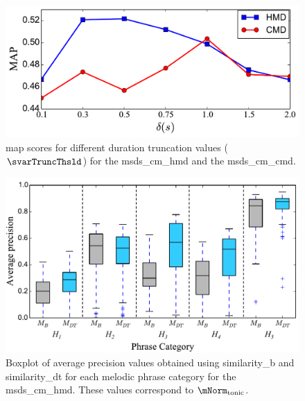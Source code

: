 \begin{figure}
	\begin{center}
		\includegraphics[width=\figSizeEightyFive]{ch06_patterns/figures/ImprovingSimilarity/MAP_per_Duration_Truncation.pdf}
	\end{center}
	\caption{\gls{map} scores for different duration truncation values ($\svarTruncThsld$) for the \acrshort{msds_cm_hmd} and the \acrshort{msds_cm_cmd}.} 
	\label{fig:map_per_duration_truncation}
\end{figure}

\begin{figure}
	\begin{center}
		\includegraphics[width=\figSizeEightyFive]{ch06_patterns/figures/ImprovingSimilarity/HindustaniPerCategoryPerformance_BOXPLOT.pdf}
	\end{center}
	\caption{Boxplot of average precision values obtained using \acrshort{similarity_b} and \acrshort{similarity_dt} for each melodic phrase category for the \acrshort{msds_cm_hmd}. These values correspond to $\mNorm_\mathrm{tonic}$.} 
	\label{fig:hinudstaniPerCategoryPerformance}
\end{figure}


